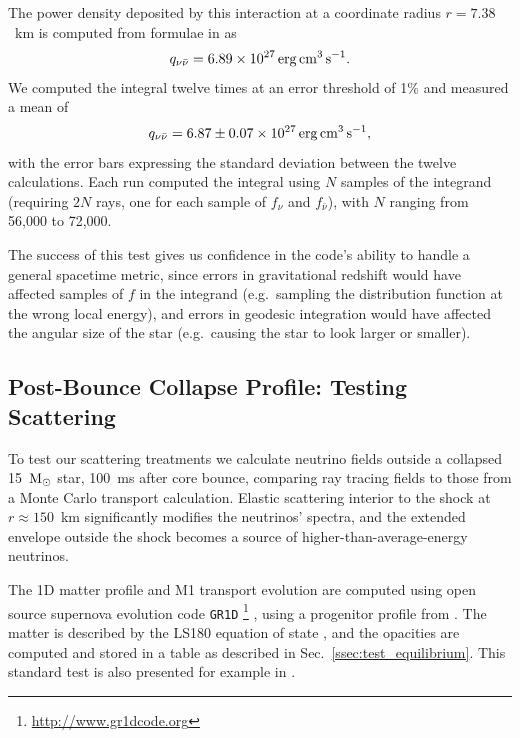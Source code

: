 \documentclass[aps,floatfix,prd,superscriptaddress,twocolumn]{revtex4-1}
\begin{document}
The power density deposited by this interaction at a coordinate radius $r=7.38$~km
is computed from formulae in \cite{asan2000-nunubar} as
\begin{equation}
  q_{\nu\bar{\nu}}=6.89\times10^{27}\,{\rm erg}\,{\rm cm^3}\,{\rm s}^{-1}.
\end{equation}
We computed the integral twelve times at an error threshold of 1\% and measured
a mean of
\begin{equation}
  q_{\nu\bar{\nu}}=6.87\pm0.07\times10^{27}\,{\rm erg}\,{\rm cm^3}\,{\rm s}^{-1},
\end{equation}
with the error bars expressing the standard deviation between the twelve
calculations. Each run computed the integral using $N$ samples of the integrand
(requiring $2N$ rays, one for each sample of $f_\nu$ and $f_{\bar{\nu}}$),
with $N$ ranging from 56,000 to 72,000.

The success of this test gives us confidence in the code's ability to handle a
general spacetime metric, since errors in gravitational redshift would have
affected samples of $f$ in the integrand (e.g.\ sampling the distribution function
at the wrong local energy), and errors in geodesic integration would have
affected the angular size of the star (e.g.\ causing the star to look larger
or smaller).

\subsection{Post-Bounce Collapse Profile:
  Testing Scattering}
\label{ssec:test_collapse}
To test our scattering treatments we calculate neutrino fields outside a
collapsed 15~${\rm M}_\odot$ star, 100~ms after core bounce,
comparing ray tracing fields to those from a Monte Carlo transport calculation.
Elastic scattering interior to the shock at $r\approx150$~km
significantly modifies the neutrinos' spectra,
and the extended envelope outside the shock becomes a source of
higher-than-average-energy neutrinos.

The 1D matter profile and M1 transport evolution are computed using
open source supernova evolution code \lstinline{GR1D}
\footnote{\url{http://www.gr1dcode.org}}
\cite{ocon2010-gr1d, ocon2015-gr1d_with_nu},
using a progenitor profile from \cite{woos1995-sn_progenitors}.
The matter is described by the LS180 equation of state \cite{latt1991-nuc_eos},
and the opacities are computed and stored in a table
as described in Sec.~\ref{ssec:test_equilibrium}.
This standard test is also presented for example in
\cite{ocon2015-gr1d_with_nu,fouc2015-m1_nsbh,abdi2012-monte_carlo}.
\end{document}
